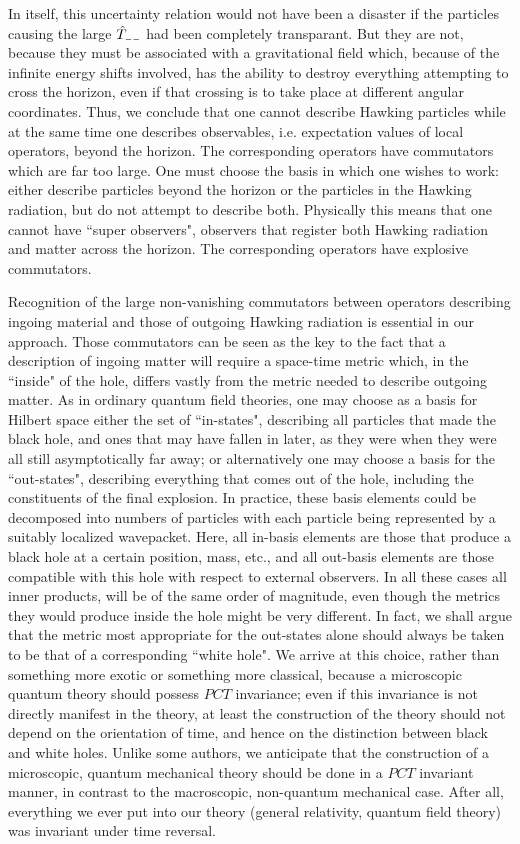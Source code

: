 In itself, this uncertainty relation would not have been a disaster if
the particles causing the large $\hat{T}_{\ss --}$ had been completely
transparant. But they are not, because they must be associated with a
gravitational field which, because of the infinite energy shifts
involved, has the ability to destroy everything attempting to cross the
horizon, even if that crossing is to take place at different angular
coordinates. Thus, we conclude that one cannot describe Hawking
particles while at the same time one describes observables, i.e.
expectation values of local operators, beyond the horizon. The
corresponding operators have commutators which are far too large. One
must choose the basis in which one wishes to work: either describe
particles beyond the horizon or the particles in the Hawking radiation,
but do not attempt to describe both. Physically this means that one
cannot have ``super observers", observers that register both Hawking
radiation and matter across the horizon. The corresponding operators
have explosive commutators.

Recognition of the large non-vanishing commutators between operators
describing ingoing material and those of outgoing Hawking radiation is
essential in our approach. Those commutators can be seen as the key to
the fact that a description of ingoing matter will require a space-time
metric which, in the ``inside" of the hole, differs vastly from the
metric needed to describe outgoing matter.  As in ordinary quantum
field theories, one may choose as a basis for Hilbert space either the
set of ``in-states", describing all particles that made the black hole,
and ones that may have fallen in later, as they were when they were all
still asymptotically far away;  or alternatively one may choose a basis
for the ``out-states", describing everything that comes out of the
hole, including the constituents of the final explosion. In practice,
these basis elements could be decomposed into numbers of particles with
each particle being represented by a suitably localized wavepacket.
Here, all in-basis elements are those that produce a black hole at a
certain position, mass, etc., and all out-basis elements are those
compatible with this hole with respect to external observers. In all
these cases all inner products, will be of the same order of magnitude,
even though the metrics they would produce inside the hole might be
very different.  In fact, we shall argue that the metric most
appropriate for the out-states alone should always be taken to be that
of a corresponding ``white hole". We arrive at this choice, rather than
something more exotic or something more classical, because a
microscopic quantum theory should possess $PCT$ invariance; even if
this invariance is not directly manifest in the theory, at least the
construction of the theory should not depend on the orientation of
time, and hence on the distinction between black and white holes.
Unlike some authors, we anticipate that the construction of a
microscopic, quantum mechanical theory should be done in a $PCT$
invariant manner, in contrast to the macroscopic, non-quantum
mechanical case. After all, everything we ever put into our theory
(general relativity, quantum field theory) was invariant under time
reversal.

